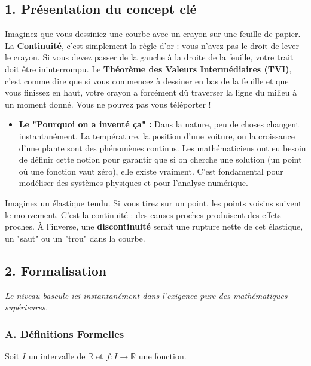 \documentclass[12pt,a4paper]{report}
\begin{document}
\subsection{1. Présentation du concept clé}
 Imaginez que vous dessiniez une courbe avec un crayon sur une feuille de papier. La \textbf{Continuité}, c'est simplement la règle d'or : vous n'avez pas le droit de lever le crayon. Si vous devez passer de la gauche à la droite de la feuille, votre trait doit être ininterrompu. Le \textbf{Théorème des Valeurs Intermédiaires (TVI)}, c'est comme dire que si vous commencez à dessiner en bas de la feuille et que vous finissez en haut, votre crayon a forcément dû traverser la ligne du milieu à un moment donné. Vous ne pouvez pas vous téléporter !
\begin{itemize}
\item \textbf{Le "Pourquoi on a inventé ça" :} Dans la nature, peu de choses changent instantanément. La température, la position d'une voiture, ou la croissance d'une plante sont des phénomènes continus. Les mathématiciens ont eu besoin de définir cette notion pour garantir que si on cherche une solution (un point où une fonction vaut zéro), elle existe vraiment. C'est fondamental pour modéliser des systèmes physiques et pour l'analyse numérique.
\end{itemize}
 Imaginez un élastique tendu. Si vous tirez sur un point, les points voisins suivent le mouvement. C'est la continuité : des causes proches produisent des effets proches. À l'inverse, une \textbf{discontinuité} serait une rupture nette de cet élastique, un "saut" ou un "trou" dans la courbe.

\subsection{2. Formalisation}
\textit{Le niveau bascule ici instantanément dans l'exigence pure des mathématiques supérieures.}

\subsubsection{A. Définitions Formelles}

Soit $I$ un intervalle de $\mathbb{R}$ et $f : I \to \mathbb{R}$ une fonction.
\end{document}
